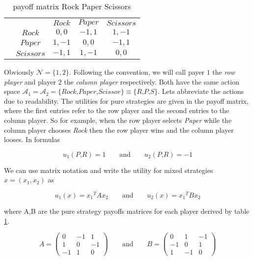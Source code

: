 \begin{table}[H]\centering
\setlength{\extrarowheight}{2pt}
\begin{tabular}{cc|c|c|c|}
  & \multicolumn{1}{c}{} & \multicolumn{1}{c}{$Rock$}  & \multicolumn{1}{c}{$Paper$}  & \multicolumn{1}{c}{$Scissors$} \\\cline{3-5}
            & $Rock$ & $0,0$ & $-1,1$ & $1,-1$ \\ \cline{3-5}
            & $Paper$ & $1,-1$ & $0,0$ & $-1,1$ \\\cline{3-5}
            & $Scissors$ & $-1,1$ & $1,-1$ & $0,0$ \\\cline{3-5}
\end{tabular}\caption{\label{tab:payoffRPSFromDefinition}payoff matrix Rock Paper Scissors}
\end{table}

Obviously $\mathcal{N} = \{1,2\}$. Following the convention, we will call payer $1$ the \textit{row player} and player $2$ the \textit{column player} respectively. Both have the same action space $\mathcal{A}_1 = \mathcal{A}_2 = \{\textit{Rock,Paper,Scissor}\} \equiv \{\textit{R,P,S\}}$. Lets abbreviate the actions due to readability. The utilities for pure strategies are given in the payoff matrix, where the first entries refer to the row player and the second entries to the column player. So for example, when the row player selects \textit{Paper} while the column player chooses \textit{Rock} then the row player wins and the column player looses. In formulas

\begin{equation*}
    u_1(\textit{P,R}) = 1 \qquad \text{and} \qquad u_2(\textit{P,R}) = -1
\end{equation*}

We can use matrix notation and write the utility for mixed strategies $x = (x_1,x_2)$ as

\begin{equation*}
    u_1(x) = x{_1}^{T}Ax_2 \qquad \text{and} \qquad u_2(x) = x{_1}^{T}Bx_2
\end{equation*}

where A,B are the pure strategy payoffs matrices for each player derived by table \ref{tab:payoffRPSFromDefinition}.

\begin{equation*}
A = \begin{pmatrix}
0 & -1 & 1\\
1 & 0 & -1\\
-1 & 1 & 0
\end{pmatrix}
\qquad \text{and} \qquad
B = \begin{pmatrix}
0 & 1 & -1\\
-1 & 0 & 1\\
1 & -1 & 0
\end{pmatrix}
\end{equation*}

